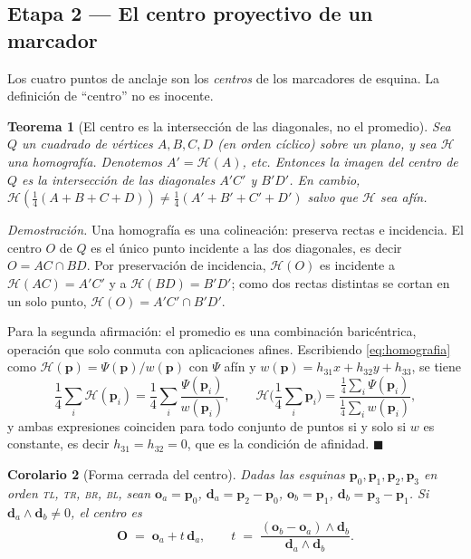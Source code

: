 \documentclass[11pt,a4paper]{article}
\newtheorem{teorema}{Teorema}[section]
\newtheorem{corolario}[teorema]{Corolario}
\theoremstyle{definition}
\newenvironment{demo}{\par\noindent\textit{Demostración.}\;}{\hfill$\blacksquare$\par\medskip}
\newcommand{\dd}{\mathbf{d}}
\newcommand{\pp}{\mathbf{p}}
\begin{document}
\subsection{Etapa 2 --- El centro proyectivo de un marcador}

Los cuatro puntos de anclaje son los \emph{centros} de los marcadores de esquina. La
definición de ``centro'' no es inocente.

\begin{teorema}[El centro es la intersección de las diagonales, no el promedio]
\label{teo:centro}
Sea $Q$ un cuadrado de vértices $A,B,C,D$ (en orden cíclico) sobre un plano, y sea
$\mathcal H$ una homografía. Denotemos $A'=\mathcal H(A)$, etc. Entonces la imagen del
centro de $Q$ es la intersección de las diagonales $A'C'$ y $B'D'$. En cambio,
$\mathcal H\!\left(\tfrac{1}{4}(A+B+C+D)\right) \neq \tfrac{1}{4}(A'+B'+C'+D')$ salvo
que $\mathcal H$ sea afín.
\end{teorema}

\begin{demo}
Una homografía es una colineación: preserva rectas e incidencia. El centro $O$ de $Q$
es el único punto incidente a las dos diagonales, es decir $O = AC \cap BD$. Por
preservación de incidencia, $\mathcal H(O)$ es incidente a $\mathcal H(AC) = A'C'$ y a
$\mathcal H(BD) = B'D'$; como dos rectas distintas se cortan en un solo punto,
$\mathcal H(O) = A'C' \cap B'D'$.

Para la segunda afirmación: el promedio es una combinación baricéntrica, operación que
solo conmuta con aplicaciones afines. Escribiendo \eqref{eq:homografia} como
$\mathcal H(\pp) = \Psi(\pp)/w(\pp)$ con $\Psi$ afín y $w(\pp) = h_{31}x+h_{32}y+h_{33}$,
se tiene
\[
  \frac{1}{4}\sum_i \mathcal H(\pp_i) = \frac{1}{4}\sum_i \frac{\Psi(\pp_i)}{w(\pp_i)},
  \qquad
  \mathcal H\!\Big(\frac{1}{4}\sum_i \pp_i\Big) = \frac{\tfrac{1}{4}\sum_i\Psi(\pp_i)}{\tfrac14\sum_i w(\pp_i)} ,
\]
y ambas expresiones coinciden para todo conjunto de puntos si y solo si $w$ es
constante, es decir $h_{31}=h_{32}=0$, que es la condición de afinidad.
\end{demo}

\begin{corolario}[Forma cerrada del centro]
Dadas las esquinas $\pp_0,\pp_1,\pp_2,\pp_3$ en orden \textsc{tl}, \textsc{tr},
\textsc{br}, \textsc{bl}, sean
$\mathbf o_a = \pp_0$, $\dd_a = \pp_2-\pp_0$, $\mathbf o_b = \pp_1$,
$\dd_b = \pp_3-\pp_1$. Si $\dd_a \wedge \dd_b \neq 0$, el centro es
\begin{equation}
  \mathbf O \;=\; \mathbf o_a + t\,\dd_a,
  \qquad
  t \;=\; \frac{(\mathbf o_b - \mathbf o_a)\wedge \dd_b}{\dd_a \wedge \dd_b}.
  \label{eq:centro}
\end{equation}
\end{corolario}
\end{document}
